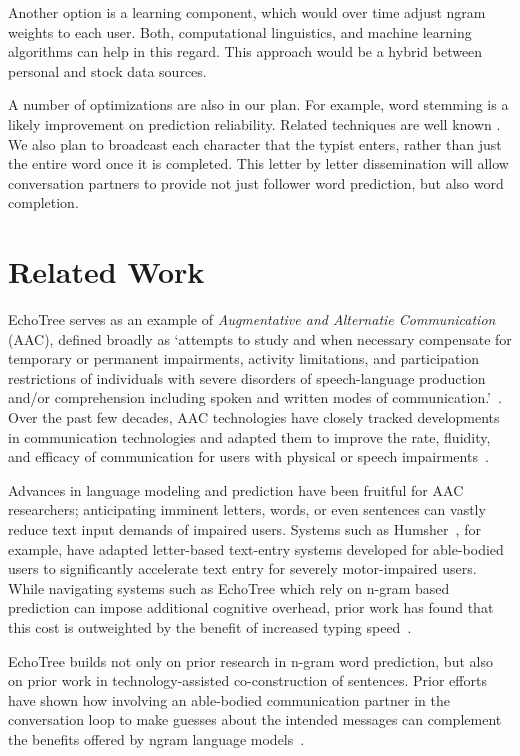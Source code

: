 \documentclass{sigchi}
\begin{document}
Another option is a learning component, which would over time adjust
ngram weights to each user. Both, computational linguistics, and
machine learning algorithms can help in this regard. This approach
would be a hybrid between personal and stock data sources.

A number of optimizations are also in our plan. For example, word
stemming is a likely improvement on prediction reliability. Related
techniques are well known \cite{PorterStemmerAlgorithm}. We also plan
to broadcast each character that the typist enters, rather than just
the entire word once it is completed. This letter by letter
dissemination will allow conversation partners to provide not just
follower word prediction, but also word completion.

\section{Related Work}

EchoTree serves as an example of {\em Augmentative and Alternatie
  Communication} (AAC), defined broadly as `attempts to study and when
necessary compensate for temporary or permanent impairments, activity
limitations, and participation restrictions of individuals with severe
disorders of speech-language production and/or comprehension including
spoken and written modes of communication.'~\cite{asha2005}. Over the
past few decades, AAC technologies have closely tracked developments
in communication technologies and adapted them to improve the rate,
fluidity, and efficacy of communication for users with physical or
speech impairments~\cite{vanderheiden2002}. 


Advances in language modeling and prediction have been fruitful for
AAC researchers; anticipating imminent letters, words, or even
sentences can vastly reduce text input demands of impaired
users. Systems such as Humsher~\cite{Polacek2011}, for example, have
adapted letter-based text-entry systems developed for able-bodied
users to significantly accelerate text entry for severely
motor-impaired users. While navigating systems such as EchoTree which
rely on n-gram based prediction can impose additional cognitive
overhead, prior work has found that this cost is outweighted by the
benefit of increased typing speed~\cite{Trnka2009}. 


EchoTree builds not only on prior research in n-gram word prediction,
but also on prior work in technology-assisted co-construction of
sentences. Prior efforts have shown how involving an able-bodied
communication partner in the conversation loop to make guesses about
the intended messages can complement the benefits offered by ngram
language models~\cite{Roark2011}. 
\end{document}
